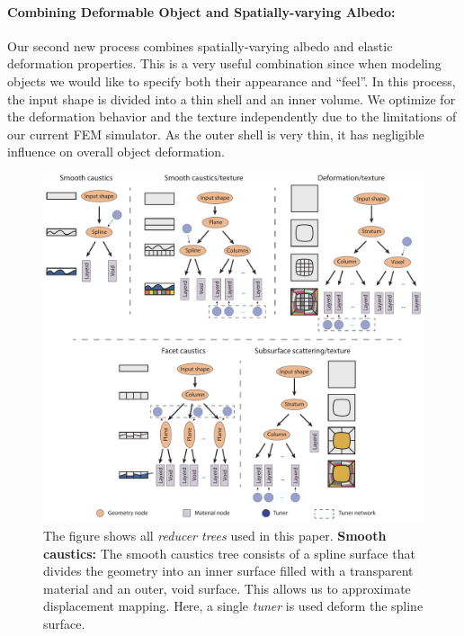 \paragraph{Combining Deformable Object and Spatially-varying Albedo:}
Our second new process combines spatially-varying albedo and elastic deformation properties. This is a very useful combination since when modeling objects we would like to specify both their appearance and ``feel''. In this process, the input shape is divided into a thin shell and an inner volume. We optimize for the deformation behavior and the texture independently due to the limitations of our current FEM simulator. As the outer shell is very thin, it has negligible influence on overall object deformation.

\begin{figure}[t]
\centering
\includegraphics*[clip, width = \linewidth]{figure/ReducerNetworksSuplemental}
\caption{The figure shows all \emph{reducer trees} used in this paper.
\textbf{Smooth caustics:} The smooth caustics tree consists of a spline surface that divides the geometry into an inner surface filled with a transparent material and an outer, void surface. This allows us to approximate displacement mapping.  Here, a single \emph{tuner} is used deform the spline surface.
}
\end{figure}
